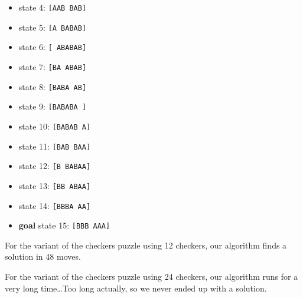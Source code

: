 \documentclass{article}
\begin{document}
\begin{itemize}
  \item state  4: \texttt{[AAB BAB]}
  \item state  5: \texttt{[A BABAB]}
  \item state  6: \texttt{[ ABABAB]}
  \item state  7: \texttt{[BA ABAB]}
  \item state  8: \texttt{[BABA AB]}  
  \item state  9: \texttt{[BABABA ]}  
  \item state 10: \texttt{[BABAB A]}  
  \item state 11: \texttt{[BAB BAA]}  
  \item state 12: \texttt{[B BABAA]}  
  \item state 13: \texttt{[BB ABAA]}  
  \item state 14: \texttt{[BBBA AA]}  
  \item \textbf{goal} state 15: \texttt{[BBB AAA]}
\end{itemize}


For the variant of the checkers puzzle using 12 checkers, our algorithm finds a
solution in 48 moves.

For the variant of the checkers puzzle using 24 checkers, our algorithm runs for
a very long time\ldots Too long actually, so we never ended up with a solution.
\end{document}
